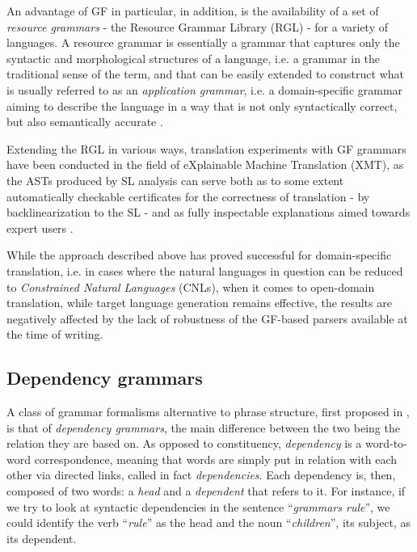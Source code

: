 An advantage of GF in particular, in addition, is the availability of a set of \textit{resource grammars} - the Resource Grammar Library (RGL) - for a variety of languages. A resource grammar is essentially a grammar that captures only the syntactic and morphological structures of a language, i.e. a grammar in the traditional sense of the term, and that can be easily extended to construct what is usually referred to as an \textit{application grammar}, i.e. a domain-specific grammar aiming to describe the language in a way that is not only syntactically correct, but also semantically accurate \cite{gfbook}. \smallskip

Extending the RGL in various ways, translation experiments with GF grammars have been conducted in the field of eXplainable Machine Translation (XMT), as the ASTs produced by SL analysis can serve both as to some extent automatically checkable certificates for the correctness of translation - by backlinearization to the SL - and as fully inspectable explanations aimed towards expert users \cite{rantaxmt}. \smallskip

While the approach described above has proved successful for domain-specific translation, i.e. in cases where the natural languages in question can be reduced to \textit{Constrained Natural Languages} (CNLs), when it comes to open-domain translation, while target language generation remains effective, the results are negatively affected by the lack of robustness of the GF-based parsers available at the time of writing.

\subsection{Dependency grammars} \label{depg}
A class of grammar formalisms alternative to phrase structure, first proposed in \cite{dg}, is that of \textit{dependency grammars}, the main difference between the two being the relation they are based on. 
As opposed to constituency, \textit{dependency} is a word-to-word correspondence, meaning that words are simply put in relation with each other via directed links, called in fact \textit{dependencies}. Each dependency is, then, composed of two words: a \textit{head} and a \textit{dependent} that refers to it. For instance, if we try to look at syntactic dependencies in the sentence ``\textit{grammars rule}'', we could identify the verb ``\textit{rule}'' as the head and the noun ``\textit{children}'', its subject, as its dependent. \smallskip 

